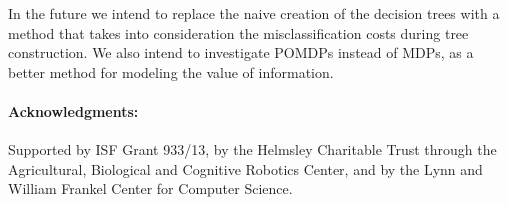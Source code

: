 \documentclass[letterpaper]{article}
\theoremstyle{definition}
\begin{document}
In the future we intend to replace the naive creation of the decision trees with a method that takes into consideration the misclassification costs during tree construction. We also intend to investigate POMDPs instead of MDPs, as a better method for modeling the value of information.

\paragraph{\bf Acknowledgments:} Supported by ISF Grant 933/13, by the Helmsley Charitable Trust through the Agricultural, Biological and Cognitive Robotics Center, and by the Lynn and William Frankel Center for Computer Science.



\end{document}
